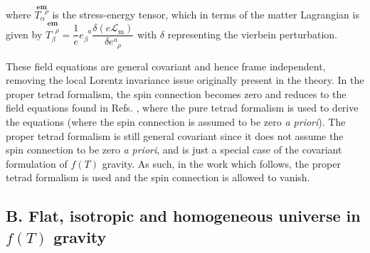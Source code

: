 \documentclass[prl,floatfix,showpacs,twocolumn,preprintnumbers,amsmath,amssymb,superscriptaddress]{revtex4}
\newcommand{\udt}[3]{#1^{#2}_{\phantom{#2}#3}}
\newcommand{\dut}[3]{#1_{#2}^{\phantom{#2}#3}}
\begin{document}
where $\stackrel{\textbf{em}}{\dut{T}{\alpha}{\rho}}$ is the stress-energy tensor, which in terms of the matter Lagrangian is given by $\stackrel{\textbf{em}}{\dut{T}{\beta}{\rho}} = \dfrac{1}{e} \dut{e}{\beta}{a} \dfrac{\delta \left(e \mathcal{L}_{\text{m}}\right)}{\delta \udt{e}{a}{\rho}}$ with $\delta$ representing the vierbein perturbation.

These field equations are general covariant and hence frame independent, removing the local Lorentz invariance issue originally present in the theory. In the proper tetrad formalism, the spin connection becomes zero and reduces to the field equations found in Refs. \cite{Harko:2014aja,Saez-Gomez:2016wxb}, where the pure tetrad formalism is used to derive the equations (where the spin connection is assumed to be zero \textit{a priori}). The proper tetrad formalism is still general covariant since it does not assume the spin connection to be zero \textit{a priori}, and is just a special case of the covariant formulation of $f(T)$ gravity. As such, in the work which follows, the proper tetrad formalism is used and the spin connection is allowed to vanish.

\subsection{B. Flat, isotropic and homogeneous universe in $f(T)$ gravity}
\end{document}
